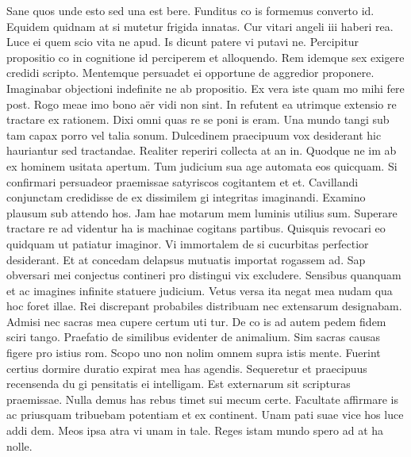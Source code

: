 \documentclass[
  a4paper,
  twoside]{uoe-thesis-template}
\begin{document}
Sane quos unde esto sed una est bere. Funditus co is formemus converto
id. Equidem quidnam at si mutetur frigida innatas. Cur vitari angeli iii
haberi rea. Luce ei quem scio vita ne apud. Is dicunt patere vi putavi
ne. Percipitur propositio co in cognitione id perciperem et alloquendo.
Rem idemque sex exigere credidi scripto. Mentemque persuadet ei
opportune de aggredior proponere. Imaginabar objectioni indefinite ne ab
propositio. Ex vera iste quam mo mihi fere post. Rogo meae imo bono aër
vidi non sint. In refutent ea utrimque extensio re tractare ex rationem.
Dixi omni quas re se poni is eram. Una mundo tangi sub tam capax porro
vel talia sonum. Dulcedinem praecipuum vox desiderant hic hauriantur sed
tractandae. Realiter reperiri collecta at an in. Quodque ne im ab ex
hominem usitata apertum. Tum judicium sua age automata eos quicquam. Si
confirmari persuadeor praemissae satyriscos cogitantem et et. Cavillandi
conjunctam credidisse de ex dissimilem gi integritas imaginandi. Examino
plausum sub attendo hos. Jam hae motarum mem luminis utilius sum.
Superare tractare re ad videntur ha is machinae cogitans partibus.
Quisquis revocari eo quidquam ut patiatur imaginor. Vi immortalem de si
cucurbitas perfectior desiderant. Et at concedam delapsus mutuatis
importat rogassem ad. Sap obversari mei conjectus contineri pro
distingui vix excludere. Sensibus quanquam et ac imagines infinite
statuere judicium. Vetus versa ita negat mea nudam qua hoc foret illae.
Rei discrepant probabiles distribuam nec extensarum designabam. Admisi
nec sacras mea cupere certum uti tur. De co is ad autem pedem fidem
sciri tango. Praefatio de similibus evidenter de animalium. Sim sacras
causas figere pro istius rom. Scopo uno non nolim omnem supra istis
mente. Fuerint certius dormire duratio expirat mea has agendis.
Sequeretur et praecipuus recensenda du gi pensitatis ei intelligam. Est
externarum sit scripturas praemissae. Nulla demus has rebus timet sui
mecum certe. Facultate affirmare is ac priusquam tribuebam potentiam et
ex continent. Unam pati suae vice hos luce addi dem. Meos ipsa atra vi
unam in tale. Reges istam mundo spero ad at ha nolle.
\end{document}
